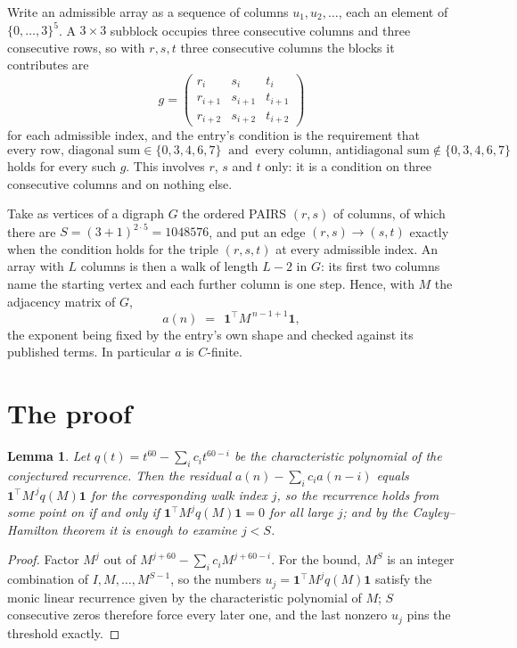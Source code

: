 \documentclass[11pt,a4paper]{article}
\theoremstyle{plain}
\newtheorem{lemma}[theorem]{Lemma}
\theoremstyle{definition}
\begin{document}
Write an admissible array as a sequence of columns $u_1,u_2,\dots$, each an element of
$\{0,\dots,3\}^{5}$. A $3\times3$ subblock occupies three consecutive columns and
three consecutive rows, so with $r,s,t$ three consecutive columns the blocks it
contributes are
\[
g=\begin{pmatrix}r_i&s_i&t_i\\ r_{i+1}&s_{i+1}&t_{i+1}\\ r_{i+2}&s_{i+2}&t_{i+2}\end{pmatrix}
\]
for each admissible index, and the entry's condition is the requirement that
\[
\text{every row, diagonal sum} \in \{0,3,4,6,7\}\ \text{ and }\ \text{every column, antidiagonal sum} \notin \{0,3,4,6,7\}
\]
holds for every such $g$. This involves $r$, $s$ and $t$ only: it is a condition on
three consecutive columns and on nothing else.

Take as vertices of a digraph $G$ the ordered PAIRS $(r,s)$ of columns, of which there are
$S=(3+1)^{2\cdot5}=1048576$, and put an edge $(r,s)\to(s,t)$ exactly when the condition
holds for the triple $(r,s,t)$ at every admissible index. An array with $L$ columns is then a
walk of length $L-2$ in $G$: its first two columns name the starting vertex and each further
column is one step. Hence, with $M$ the adjacency matrix of $G$,
\[
a(n)\;=\;\,\mathbf{1}^{\!\top}M^{\,n-1+1}\mathbf{1},
\]
the exponent being fixed by the entry's own shape and checked against its published terms.
In particular $a$ is $C$-finite.

\section{The proof}

\begin{lemma}\label{lem:crit}
Let $q(t)=t^{60}-\sum_i c_it^{60-i}$ be the characteristic polynomial of the
conjectured recurrence. Then the residual $a(n)-\sum_ic_ia(n-i)$ equals
$\mathbf{1}^{\!\top}M^{\,j}q(M)\mathbf{1}$ for the corresponding walk index
$j$, so the recurrence holds from some point on if and only if
$\mathbf{1}^{\!\top}M^{j}q(M)\mathbf{1}=0$ for all large $j$; and by the
Cayley--Hamilton theorem it is enough to examine $j<S$.
\end{lemma}

\begin{proof}
Factor $M^{j}$ out of $M^{j+60}-\sum_ic_iM^{j+60-i}$. For the bound, $M^{S}$
is an integer combination of $I,M,\dots,M^{S-1}$, so the numbers
$u_j=\mathbf{1}^{\!\top}M^{j}q(M)\mathbf{1}$ satisfy the monic linear recurrence given by
the characteristic polynomial of $M$; $S$ consecutive zeros therefore force every later one,
and the last nonzero $u_j$ pins the threshold exactly.
\end{proof}
\end{document}
